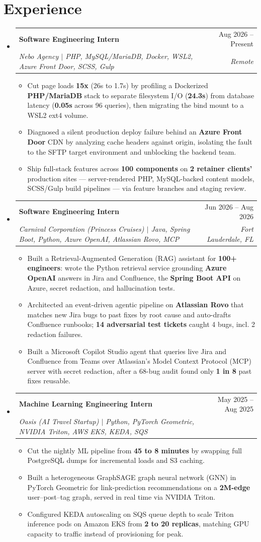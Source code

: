 \documentclass[letterpaper,10pt]{article}
\makeatletter
\newcommand{\resumeItem}[1]{\item\small{#1\vspace{-1pt}}}
\newcommand{\resumeSubheading}[4]{%
  \vspace{5pt}\item
  \begin{tabular*}{0.97\textwidth}{l@{\extracolsep{\fill}}r}
    \textbf{#1} & \small #2 \\
    \textit{\small #3} & \textit{\small #4}
  \end{tabular*}\vspace{-5pt}}
\newcommand{\resumeSubHeadingListStart}{\begin{itemize}[leftmargin=0.15in,label={},topsep=0pt,partopsep=0pt,parsep=0pt,itemsep=0pt]}
\newcommand{\resumeSubHeadingListEnd}{\end{itemize}\vspace{-3pt}}
\newcommand{\resumeItemListStart}{\begin{itemize}[leftmargin=*,topsep=1pt,itemsep=0pt,parsep=0pt]}
\newcommand{\resumeItemListEnd}{\end{itemize}\vspace{-5pt}}
\makeatother
\begin{document}
\section{Experience}
\resumeSubHeadingListStart
  \resumeSubheading{Software Engineering Intern}{Aug 2026 -- Present}{Nebo Agency $|$ PHP, MySQL/MariaDB, Docker, WSL2, Azure Front Door, SCSS, Gulp}{Remote}
  \resumeItemListStart
    \resumeItem{Cut page loads \textbf{15x} (26s to 1.7s) by profiling a Dockerized \textbf{PHP/MariaDB} stack to separate filesystem I/O (\textbf{24.3s}) from database latency (\textbf{0.05s} across 96 queries), then migrating the bind mount to a WSL2 ext4 volume.}
    \resumeItem{Diagnosed a silent production deploy failure behind an \textbf{Azure Front Door} CDN by analyzing cache headers against origin, isolating the fault to the SFTP target environment and unblocking the backend team.}
    \resumeItem{Ship full-stack features across \textbf{100 components} on \textbf{2 retainer clients'} production sites --- server-rendered PHP, MySQL-backed content models, SCSS/Gulp build pipelines --- via feature branches and staging review.}
  \resumeItemListEnd
  \resumeSubheading{Software Engineering Intern}{Jun 2026 -- Aug 2026}{Carnival Corporation (Princess Cruises) $|$ Java, Spring Boot, Python, Azure OpenAI, Atlassian Rovo, MCP}{Fort Lauderdale, FL}
  \resumeItemListStart
    \resumeItem{Built a Retrieval-Augmented Generation (RAG) assistant for \textbf{100+ engineers}: wrote the Python retrieval service grounding \textbf{Azure OpenAI} answers in Jira and Confluence, the \textbf{Spring Boot API} on Azure, secret redaction, and hallucination tests.}
    \resumeItem{Architected an event-driven agentic pipeline on \textbf{Atlassian Rovo} that matches new Jira bugs to past fixes by root cause and auto-drafts Confluence runbooks; \textbf{14 adversarial test tickets} caught 4 bugs, incl. 2 redaction failures.}
    \resumeItem{Built a Microsoft Copilot Studio agent that queries live Jira and Confluence from Teams over Atlassian's Model Context Protocol (MCP) server with secret redaction, after a 68-bug audit found only \textbf{1 in 8} past fixes reusable.}
  \resumeItemListEnd
  \resumeSubheading{Machine Learning Engineering Intern}{May 2025 -- Aug 2025}{Oasis (AI Travel Startup) $|$ Python, PyTorch Geometric, NVIDIA Triton, AWS EKS, KEDA, SQS}{}
  \resumeItemListStart
    \resumeItem{Cut the nightly ML pipeline from \textbf{45 to 8 minutes} by swapping full PostgreSQL dumps for incremental loads and S3 caching.}
    \resumeItem{Built a heterogeneous GraphSAGE graph neural network (GNN) in PyTorch Geometric for link-prediction recommendations on a \textbf{2M-edge} user--post--tag graph, served in real time via NVIDIA Triton.}
    \resumeItem{Configured KEDA autoscaling on SQS queue depth to scale Triton inference pods on Amazon EKS from \textbf{2 to 20 replicas}, matching GPU capacity to traffic instead of provisioning for peak.}
  \resumeItemListEnd
\resumeSubHeadingListEnd
\end{document}
